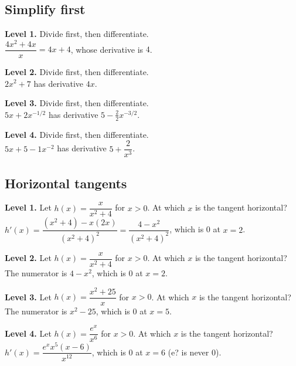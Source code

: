 \documentclass[11pt]{article}
\begin{document}
\subsection*{Simplify first}
\noindent\textbf{Level 1.} Divide first, then differentiate.\\  \quad $\dfrac{4x^{2}+4x}{x}=4x+4$, whose derivative is $4$.\par\medskip
\noindent\textbf{Level 2.} Divide first, then differentiate.\\  \quad $2x^{2}+7$ has derivative $4x$.\par\medskip
\noindent\textbf{Level 3.} Divide first, then differentiate.\\  \quad $5x+2x^{-1/2}$ has derivative $5-\tfrac{2}{2}x^{-3/2}$.\par\medskip
\noindent\textbf{Level 4.} Divide first, then differentiate.\\  \quad $5x+5-1x^{-2}$ has derivative $5+\dfrac{2}{x^{3}}$.\par\medskip
\subsection*{Horizontal tangents}
\noindent\textbf{Level 1.} Let $h(x)=\dfrac{x}{x^{2}+4}$ for $x>0$. At which $x$ is the tangent horizontal?\\  \quad $h'(x)=\dfrac{(x^{2}+4)-x(2x)}{(x^{2}+4)^{2}}=\dfrac{4-x^{2}}{(x^{2}+4)^{2}}$, which is 0 at $x=2$.\par\medskip
\noindent\textbf{Level 2.} Let $h(x)=\dfrac{x}{x^{2}+4}$ for $x>0$. At which $x$ is the tangent horizontal?\\  \quad The numerator is $4-x^{2}$, which is 0 at $x=2$.\par\medskip
\noindent\textbf{Level 3.} Let $h(x)=\dfrac{x^{2}+25}{x}$ for $x>0$. At which $x$ is the tangent horizontal?\\  \quad The numerator is $x^{2}-25$, which is 0 at $x=5$.\par\medskip
\noindent\textbf{Level 4.} Let $h(x)=\dfrac{e^{x}}{x^{6}}$ for $x>0$. At which $x$ is the tangent horizontal?\\  \quad $h'(x)=\dfrac{e^{x}x^{5}(x-6)}{x^{12}}$, which is 0 at $x=6$ (e? is never 0).\par\medskip
\end{document}
